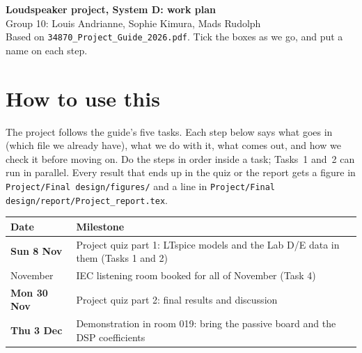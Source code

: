 \documentclass[a4paper,10pt]{article}
\newcommand{\file}[1]{\nolinkurl{#1}}
\newcommand{\cmd}[1]{\texttt{#1}}   %
\begin{document}
\begin{center}
{\Large\bfseries Loudspeaker project, System D: work plan}\\[5pt]
Group 10: Louis Andrianne, Sophie Kimura, Mads Rudolph\\[3pt]
Based on \file{34870_Project_Guide_2026.pdf}. Tick the boxes as we go, and put a name on each step.
\end{center}

\section*{How to use this}
The project follows the guide's five tasks. Each step below says what goes in (which file we
already have), what we do with it, what comes out, and how we check it before moving on. Do the
steps in order inside a task; Tasks~1 and~2 can run in parallel. Every result that ends up in
the quiz or the report gets a figure in \cmd{Project/Final design/figures/} and a line in
\cmd{Project/Final design/report/Project\_report.tex}.

\begin{center}
\begin{tabularx}{\linewidth}{lX}
\toprule
Date & Milestone \\
\midrule
\textbf{Sun 8 Nov} & Project quiz part 1: LTspice models and the Lab D/E data in them (Tasks 1 and 2) \\
November & IEC listening room booked for all of November (Task 4) \\
\textbf{Mon 30 Nov} & Project quiz part 2: final results and discussion \\
\textbf{Thu 3 Dec} & Demonstration in room 019: bring the passive board and the DSP coefficients \\
\bottomrule
\end{tabularx}
\end{center}
\end{document}
